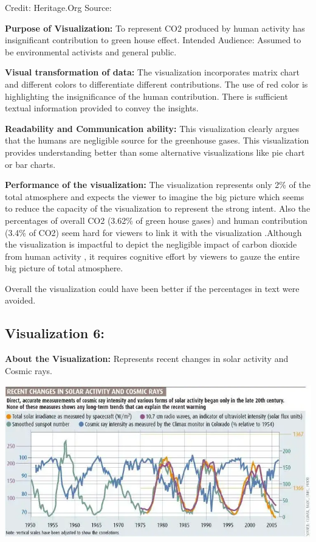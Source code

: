 \documentclass[]{book}
\begin{document}
Credit: Heritage.Org
Source: \citep{NotHuman}

\textbf{Purpose of Visualization:} To represent CO2 produced by human activity has insignificant contribution to green house effect.
Intended Audience: Assumed to be environmental activists and general public.

\textbf{Visual transformation of data:} The visualization incorporates matrix chart and different colors to differentiate different contributions. The use of red color is highlighting the insignificance of the human contribution. There is sufficient textual information provided to convey the insights.

\textbf{Readability and Communication ability:} This visualization clearly argues that the humans are negligible source for the greenhouse gases. This visualization provides understanding better than some alternative visualizations like pie chart or bar charts.

\textbf{Performance of the visualization:} The visualization represents only 2\% of the total atmosphere and expects the viewer to imagine the big picture which seems to reduce the capacity of the visualization to represent the strong intent. Also the percentages of overall CO2 (3.62\% of green house gases) and human contribution (3.4\% of CO2) seem hard for viewers to link it with the visualization .Although the visualization is impactful to depict the negligible impact of carbon dioxide from human activity , it requires cognitive effort by viewers to gauze the entire big picture of total atmosphere.

Overall the visualization could have been better if the percentages in text were avoided.

\hypertarget{visualization-6}{%
\subsection{Visualization 6:}\label{visualization-6}}

\textbf{About the Visualization:} Represents recent changes in solar activity and Cosmic rays.

\includegraphics{_images/Vz7.png}
\end{document}
